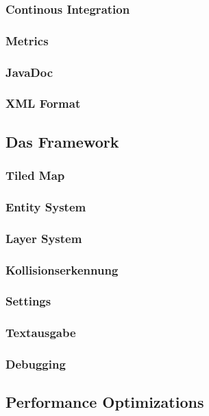 		\subsubsection{Continous Integration}
		\subsubsection{Metrics}
		\subsubsection{JavaDoc}
		\subsubsection{XML Format}
	\subsection{Das Framework}
		\subsubsection{Tiled Map}
		\subsubsection{Entity System}
		\subsubsection{Layer System}
		\subsubsection{Kollisionserkennung}
		\subsubsection{Settings}
		\subsubsection{Textausgabe}
		\subsubsection{Debugging}
	\subsection{Performance Optimizations}
